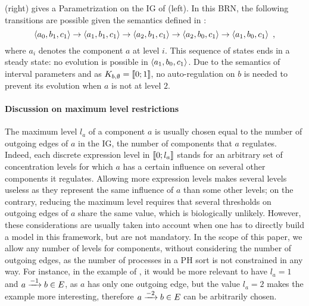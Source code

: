 \begin{example}
(right) gives a Parametrization on the IG of (left).
In this BRN, the following transitions are possible given the semantics defined in :
$$\mbox{$\langle a_0, b_1, c_1 \rangle$} \rightarrow \mbox{$\langle a_1, b_1, c_1 \rangle$} \rightarrow \mbox{$\langle a_2, b_1, c_1 \rangle$} \rightarrow
\mbox{$\langle a_2, b_0, c_1 \rangle$} \rightarrow \mbox{$\langle a_1, b_0, c_1 \rangle$} \enspace,$$
where $a_i$ denotes the component $a$ at level $i$.
This sequence of states ends in a steady state: no evolution is possible in $\mbox{$\langle a_1, b_0, c_1 \rangle$}$.
Due to the semantics of interval parameters and as $K_{b,\emptyset} = \llbracket 0 ; 1 \rrbracket$, no auto-regulation on $b$ is needed to prevent its evolution when $a$ is not at level $2$.
\end{example}


\paragraph{Discussion on maximum level restrictions}
The maximum level $l_a$ of a component $a$ is usually chosen equal to the number of outgoing edges of $a$ in the IG, \ie the number of components that $a$ regulates.
Indeed, each discrete expression level in $\llbracket 0 ; l_a \rrbracket$ stands for an arbitrary set of concentration levels for which $a$ has a certain influence on several other components it regulates.
Allowing more expression levels makes several levels useless as they represent the same influence of $a$ than some other levels;
on the contrary, reducing the maximum level requires that several thresholds on outgoing edges of $a$ share the same value, which is biologically unlikely.
However, these considerations are usually taken into account when one has to directly build a model in this framework, but are not mandatory.
In the scope of this paper, we allow any number of levels for components, without considering the number of outgoing edges,
as the number of processes in a PH sort is not constrained in any way.
For instance, in the example of ,
it would be more relevant to have $l_a = 1$ and $a \xrightarrow{- 1} b \in E$, as $a$ has only one outgoing edge,
but the value $l_a = 2$ makes the example more interesting, therefore $a \xrightarrow{- 2} b \in E$ can be arbitrarily chosen.

